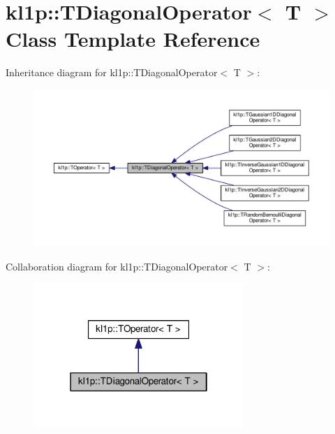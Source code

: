 \hypertarget{classkl1p_1_1TDiagonalOperator}{}\section{kl1p\+:\+:T\+Diagonal\+Operator$<$ T $>$ Class Template Reference}
\label{classkl1p_1_1TDiagonalOperator}


Inheritance diagram for kl1p\+:\+:T\+Diagonal\+Operator$<$ T $>$\+:
\nopagebreak
\begin{figure}[H]
\begin{center}
\leavevmode
\includegraphics[width=350pt]{classkl1p_1_1TDiagonalOperator__inherit__graph}
\end{center}
\end{figure}


Collaboration diagram for kl1p\+:\+:T\+Diagonal\+Operator$<$ T $>$\+:
\nopagebreak
\begin{figure}[H]
\begin{center}
\leavevmode
\includegraphics[width=226pt]{classkl1p_1_1TDiagonalOperator__coll__graph}
\end{center}
\end{figure}
